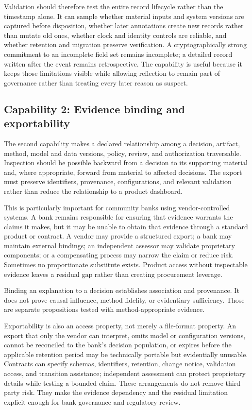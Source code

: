 Validation should therefore test the entire record lifecycle rather than the
timestamp alone. It can sample whether material inputs and system versions are
captured before disposition, whether later annotations create new records
rather than mutate old ones, whether clock and identity controls are reliable,
and whether retention and migration preserve verification. A cryptographically
strong commitment to an incomplete field set remains incomplete; a detailed
record written after the event remains retrospective. The capability is useful
because it keeps those limitations visible while allowing reflection to remain
part of governance rather than treating every later reason as suspect.

\subsection{Capability 2: Evidence binding and exportability}
\label{sec:primitives:evidence-binding}

The second capability makes a declared relationship among a decision, artifact,
method, model and data versions, policy, review, and authorization traversable.
Inspection should be possible backward from a decision to its supporting
material and, where appropriate, forward from material to affected decisions.
The export must preserve identifiers, provenance, configurations, and relevant
validation rather than reduce the relationship to a product dashboard.

This is particularly important for community banks using vendor-controlled
systems. A bank remains responsible for ensuring that evidence warrants the
claims it makes, but it may be unable to obtain that evidence through a standard
product or contract. A vendor may provide a structured export; a bank may
maintain external bindings; an independent assessor may validate proprietary
components; or a compensating process may narrow the claim or reduce risk.
Sometimes no proportionate substitute exists. Product access without inspectable
evidence leaves a residual gap rather than creating procurement leverage.

Binding an explanation to a decision establishes association and provenance.
It does not prove causal influence, method fidelity, or evidentiary sufficiency.
Those are separate propositions tested with method-appropriate evidence.

Exportability is also an access property, not merely a file-format property. An
export that only the vendor can interpret, omits model or configuration
versions, cannot be reconciled to the bank's decision population, or expires
before the applicable retention period may be technically portable but
evidentially unusable. Contracts can specify schemas, identifiers, retention,
change notice, validation access, and transition assistance; independent
assessment can protect proprietary details while testing a bounded claim. These
arrangements do not remove third-party risk. They make the evidence dependency
and the residual limitation explicit enough for bank governance and regulatory
review.

